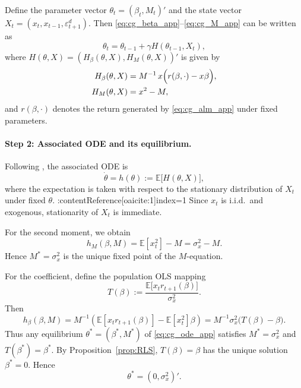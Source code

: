 \documentclass[11pt]{article}
\begin{document}
Define the parameter vector $\theta_t=(\beta_t,M_t)'$ and the state vector
$X_t=(x_t,x_{t-1},\varepsilon^d_{t+1})$. Then \eqref{eq:cg_beta_app}--\eqref{eq:cg_M_app} can be written as
\begin{equation}\label{eq:cg_standard_form}
    \theta_t=\theta_{t-1}+\gamma H(\theta_{t-1},X_t),
\end{equation}
where $H(\theta,X)=(H_\beta(\theta,X),H_M(\theta,X))'$ is given by
\begin{align}
    H_\beta(\theta,X)
    &=
    M^{-1}\,x\Bigl(r(\beta,\cdot)-x\beta\Bigr), \\
    H_M(\theta,X)
    &=
    x^2-M,
\end{align}
and $r(\beta,\cdot)$ denotes the return generated by \eqref{eq:cg_alm_app} under fixed parameters.

\paragraph{Step 2: Associated ODE and its equilibrium.}
Following \citet{GeorgeWEvans2001}, the associated ODE is
\begin{equation}\label{eq:cg_ode_app}
    \dot\theta=h(\theta):=\mathbb E\bigl[H(\theta,X)\bigr],
\end{equation}
where the expectation is taken with respect to the stationary distribution of $X_t$ under fixed $\theta$. :contentReference[oaicite:1]{index=1}
Since $x_t$ is i.i.d.\ and exogenous, stationarity of $X_t$ is immediate.

For the second moment, we obtain
\begin{equation}
    h_M(\beta,M)=\mathbb E[x_t^2]-M=\sigma_x^2-M.
\end{equation}
Hence $M^*=\sigma_x^2$ is the unique fixed point of the $M$-equation.

For the coefficient, define the population OLS mapping
\begin{equation}\label{eq:T_map_app}
    T(\beta):=\frac{\mathbb E\big[x_t r_{t+1}(\beta)\big]}{\sigma_x^2}.
\end{equation}
Then
\begin{equation}\label{eq:hbeta_app}
    h_\beta(\beta,M)
    =
    M^{-1}\left(\mathbb E[x_t r_{t+1}(\beta)]-\mathbb E[x_t^2]\beta\right)
    =
    M^{-1}\sigma_x^2\bigl(T(\beta)-\beta\bigr).
\end{equation}
Thus any equilibrium $\theta^*=(\beta^*,M^*)$ of \eqref{eq:cg_ode_app} satisfies $M^*=\sigma_x^2$ and $T(\beta^*)=\beta^*$.
By Proposition~\ref{prop:RLS}, $T(\beta)=\beta$ has the unique solution $\beta^*=0$. Hence
\begin{equation}
    \theta^*=(0,\sigma_x^2)'.
\end{equation}
\end{document}
